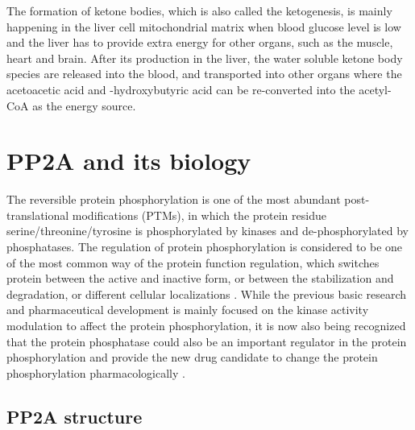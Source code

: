 The formation of ketone bodies, which is also called the ketogenesis, is mainly happening in the liver cell mitochondrial matrix when blood glucose level is low and the liver has to provide extra energy for other organs, such as the muscle, heart and brain. After its production in the liver, the water soluble ketone body species are released into the blood, and transported into other organs where the acetoacetic acid and \textbeta{}-hydroxybutyric acid can be re-converted into the acetyl-CoA as the energy source. 


\section{PP2A and its biology}

The reversible protein phosphorylation is one of the most abundant post-translational modifications (PTMs), in which the protein residue serine/threonine/tyrosine is phosphorylated by kinases and de-phosphorylated by phosphatases. The regulation of protein phosphorylation is considered to be one of the most common way of the protein function regulation, which switches protein between the active and inactive form, or between the stabilization and degradation, or different cellular localizations \cite{ptacek_charging_2006,pawson_protein_2005,cohen_regulation_2000}. While the previous basic research and pharmaceutical development is mainly focused on the kinase activity modulation to affect the protein phosphorylation, it is now also being recognized that the protein phosphatase could also be an important regulator in the protein phosphorylation and provide the new drug candidate to change the protein phosphorylation pharmacologically \cite{newton_turning_2014,khanna_cancerous_2013,chatterjee_targeting_2013,de_munter_challenges_2013,dadke_protein-tyrosine_2003}. 

\subsection{PP2A structure}

